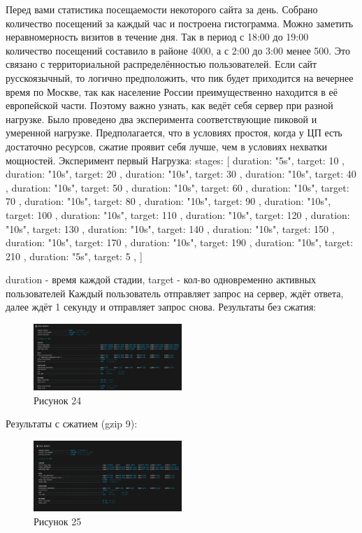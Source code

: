 \documentclass[12pt]{article}
\begin{document}
    Перед вами статистика посещаемости некоторого сайта за день. Собрано количество посещений за каждый час и построена гистограмма.
    Можно заметить неравномерность визитов в течение дня. Так в период с 18:00 до 19:00 количество посещений составило в районе 4000, а с 2:00 до 3:00 менее 500. Это связано с территориальной распределённостью пользователей. Если сайт русскоязычный, то логично предположить, что пик будет приходится на вечернее время по Москве, так как население России преимущественно находится в её европейской части. Поэтому важно узнать, как ведёт себя сервер при разной нагрузке.
    Было проведено два эксперимента соответствующие пиковой и умеренной нагрузке. Предполагается, что в условиях простоя, когда у ЦП есть достаточно ресурсов, сжатие проявит себя лучше, чем в условиях нехватки мощностей.
    Эксперимент первый
    Нагрузка:
    stages: [
    { duration: "5s", target: 10 },
    { duration: "10s", target: 20 },
    { duration: "10s", target: 30 },
    { duration: "10s", target: 40 },
    { duration: "10s", target: 50 },
    { duration: "10s", target: 60 },
    { duration: "10s", target: 70 },
    { duration: "10s", target: 80 },
    { duration: "10s", target: 90 },
    { duration: "10s", target: 100 },
    { duration: "10s", target: 110 },
    { duration: "10s", target: 120 },
    { duration: "10s", target: 130 },
    { duration: "10s", target: 140 },
    { duration: "10s", target: 150 },
    { duration: "10s", target: 170 },
    { duration: "10s", target: 190 },
    { duration: "10s", target: 210 },
    { duration: "5s", target: 5 },
    ]

    duration - время каждой стадии, target - кол-во одновременно активных пользователей
    Каждый пользователь отправляет запрос на сервер, ждёт ответа, далее ждёт 1 секунду и отправляет запрос снова.
    Результаты без сжатия:
    \begin{figure}[h!]
        \centering
        \includegraphics[width=0.5\textwidth]{../images/no-compress_exp1_k6screen.png}
        \caption{Рисунок 24}
    \end{figure}

    Результаты с сжатием (gzip 9):
    \begin{figure}[h!]
        \centering
        \includegraphics[width=0.5\textwidth]{../images/gzip9_exp1_k6screen.png}
        \caption{Рисунок 25}
    \end{figure}
\end{document}
